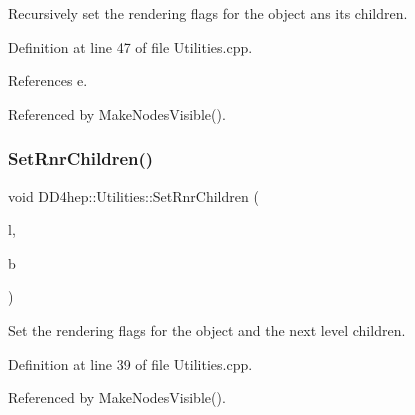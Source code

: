 Recursively set the rendering flags for the object ans its children. 



Definition at line 47 of file Utilities.\+cpp.



References e.



Referenced by Make\+Nodes\+Visible().

\hypertarget{namespace_d_d4hep_1_1_utilities_a39b86ff9be41d39a9569a9a45c9484c2}{}\label{namespace_d_d4hep_1_1_utilities_a39b86ff9be41d39a9569a9a45c9484c2} 
\subsubsection{\texorpdfstring{Set\+Rnr\+Children()}{SetRnrChildren()}}
{\footnotesize\ttfamily void D\+D4hep\+::\+Utilities\+::\+Set\+Rnr\+Children (\begin{DoxyParamCaption}\item[{\hyperlink{class_t_eve_element_list}{T\+Eve\+Element\+List} $\ast$}]{l,  }\item[{bool}]{b }\end{DoxyParamCaption})}



Set the rendering flags for the object and the next level children. 



Definition at line 39 of file Utilities.\+cpp.



Referenced by Make\+Nodes\+Visible().

